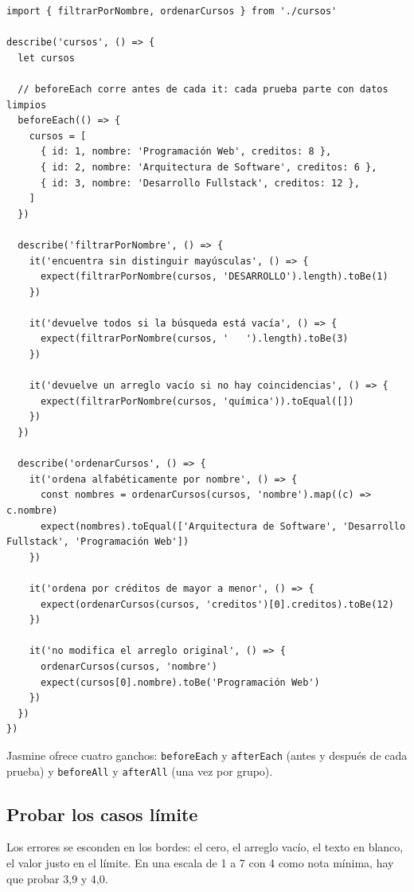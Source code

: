 \documentclass[11pt,a4paper]{article}
\newcommand{\cmd}[1]{\texttt{\color{reactdark}#1}}
\begin{document}
\begin{lstlisting}[language=JSX,title={\small\ttfamily src/logica/cursos.spec.js}]
import { filtrarPorNombre, ordenarCursos } from './cursos'

describe('cursos', () => {
  let cursos

  // beforeEach corre antes de cada it: cada prueba parte con datos limpios
  beforeEach(() => {
    cursos = [
      { id: 1, nombre: 'Programación Web', creditos: 8 },
      { id: 2, nombre: 'Arquitectura de Software', creditos: 6 },
      { id: 3, nombre: 'Desarrollo Fullstack', creditos: 12 },
    ]
  })

  describe('filtrarPorNombre', () => {
    it('encuentra sin distinguir mayúsculas', () => {
      expect(filtrarPorNombre(cursos, 'DESARROLLO').length).toBe(1)
    })

    it('devuelve todos si la búsqueda está vacía', () => {
      expect(filtrarPorNombre(cursos, '   ').length).toBe(3)
    })

    it('devuelve un arreglo vacío si no hay coincidencias', () => {
      expect(filtrarPorNombre(cursos, 'química')).toEqual([])
    })
  })

  describe('ordenarCursos', () => {
    it('ordena alfabéticamente por nombre', () => {
      const nombres = ordenarCursos(cursos, 'nombre').map((c) => c.nombre)
      expect(nombres).toEqual(['Arquitectura de Software', 'Desarrollo Fullstack', 'Programación Web'])
    })

    it('ordena por créditos de mayor a menor', () => {
      expect(ordenarCursos(cursos, 'creditos')[0].creditos).toBe(12)
    })

    it('no modifica el arreglo original', () => {
      ordenarCursos(cursos, 'nombre')
      expect(cursos[0].nombre).toBe('Programación Web')
    })
  })
})
\end{lstlisting}

Jasmine ofrece cuatro ganchos: \cmd{beforeEach} y \cmd{afterEach} (antes y después de cada prueba) y \cmd{beforeAll} y \cmd{afterAll} (una vez por grupo).

\subsection{Probar los casos límite}

Los errores se esconden en los bordes: el cero, el arreglo vacío, el texto en blanco, el valor justo en el límite. En una escala de 1 a 7 con 4 como nota mínima, hay que probar 3,9 y 4,0.
\end{document}
